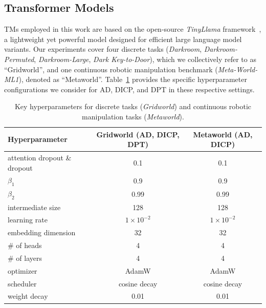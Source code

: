 \documentclass{article}
\begin{document}
\subsection{Transformer Models}
\label{append_transformer_hyperparameter}
TMs employed in this work are based on the open-source \emph{TinyLlama} framework~\citep{zhang2024tinyllama},
a lightweight yet powerful model designed for efficient large language model variants.
Our experiments cover four discrete tasks (\textit{Darkroom}, \textit{Darkroom-Permuted}, \textit{Darkroom-Large}, \textit{Dark Key-to-Door}), which we collectively refer to as ``Gridworld'', and one continuous robotic manipulation benchmark (\textit{Meta-World-ML1}), denoted as ``Metaworld''.
Table~\ref{tab:hyp-tf} provides the specific hyperparameter configurations we consider for AD, DICP, and DPT in these respective settings.
\begin{table}[h]
\caption{Key hyperparameters for discrete tasks (\textit{Gridworld}) and continuous robotic manipulation tasks (\textit{Metaworld}).}
\label{tab:hyp-tf}
\centering
\begin{tabular}{lcc}
\toprule
\textbf{Hyperparameter} & \textbf{Gridworld (AD, DICP, DPT)} & \textbf{Metaworld (AD, DICP)} \\
\midrule
attention dropout \& dropout   & 0.1           & 0.1 \\
$\beta_1$             & 0.9           & 0.9 \\
$\beta_2$             & 0.99          & 0.99\\
intermediate size    & 128           & 128 \\
learning rate         & $1\times10^{-2}$ & $1\times10^{-2}$ \\
embedding dimension          & 32            & 32  \\
\# of heads           & 4             & 4   \\
\# of layers          & 4             & 4   \\
optimizer             & AdamW         & AdamW \\
scheduler             & cosine decay  & cosine decay \\
weight decay         & 0.01          & 0.01 \\
\bottomrule
\end{tabular}
\end{table}
\end{document}
